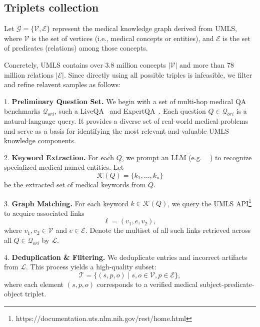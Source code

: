 \subsection{Triplets collection}
\label{sec:data_collect}
Let $\mathcal{G}=\{\mathcal{V}, \mathcal{E}\}$ represent the medical knowledge graph derived from UMLS, where $\mathcal{V}$ is the set of vertices (i.e., medical concepts or entities), and $\mathcal{E}$ is the set of predicates (relations) among those concepts.

Concretely, UMLS contains over 3.8 million concepts $|\mathcal{V}|$ and more than 78 million relations $|\mathcal{E}|$. Since directly using all possible triples is infeasible, we filter and refine relavent samples as follows:

1. \textbf{Preliminary Question Set.} We begin with a set of multi-hop medical QA benchmarks $\mathcal{Q}_{ori}$, such a LiveQA~\cite{abacha2017overview} and ExpertQA~\cite{malaviya-etal-2024-expertqa}. Each question $Q\in \mathcal{Q}_{ori}$ is a natural-language query. It provides a diverse set of real-world medical problems and serve as a basis for identifying the most relevant and valuable UMLS knowledge components.

2. \textbf{Keyword Extraction.} For each $Q$, we prompt an LLM (e.g. \gptfour~\cite{openai2023gpt4} ) to recognize specialized medical named entities. Let 
\begin{equation*}
\mathcal{K}(Q)=\{k_1,\dots,k_n\}
\end{equation*}
be the extracted set of medical keywords from $Q$.

3. \textbf{Graph Matching.} For each keyword $k\in\mathcal{K}(Q)$, we query the UMLS API\footnote{https://documentation.uts.nlm.nih.gov/rest/home.html} to acquire associated links 
\begin{equation*}
\ell=(v_1, e, v_2),
\end{equation*}
where $v_1, v_2\in \mathcal{V}$ and $e\in \mathcal{E}$. Denote the multiset of all such links retrieved across all $Q \in \mathcal{Q}_{ori}$ by $\mathcal{L}$.

4. \textbf{Deduplication \& Filtering.} We deduplicate entries and incorrect artifacts from $\mathcal{L}$. This process yields a high-quality subset:
\begin{equation*}
\mathcal{T}=\{ (s,p,o) \mid s,o \in \mathcal{V}, p\in \mathcal{E} \},
\end{equation*}
where each element $(s,p,o)$ corresponds to a verified medical subject-predicate-object triplet.

